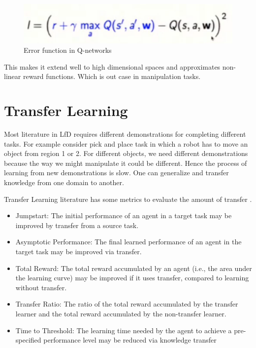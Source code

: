 \documentclass{article}[11pt]
\begin{document}
\begin{figure}[H]
  \begin{center}
    \includegraphics[width=0.5\linewidth]{images/error}
    \caption{Error function in Q-networks}
    \label{fig:error}
  \end{center}
\end{figure}

This makes it extend well to high dimensional spaces and approximates non-linear reward functions. Which is out case in manipulation tasks. 

\section{Transfer Learning}
Most literature in LfD requires different demonstrations for completing different tasks. For example consider pick and place task in which a robot has to move an object from region 1 or 2. For different objects, we need different demonstrations because the way we might manipulate it could be different. Hence the process of learning from new demonstrations is slow. One can generalize and transfer knowledge from one domain to another. 

Transfer Learning literature has some metrics to evaluate the amount of transfer \cite{taylor2009transfer}.

\begin{itemize}
\item Jumpstart: The initial performance of an agent in a target task may be improved by transfer
from a source task.
\item Asymptotic Performance: The final learned performance of an agent in the target task may be
improved via transfer.
\item Total Reward: The total reward accumulated by an agent (i.e., the area under the learning
curve) may be improved if it uses transfer, compared to learning without transfer.
\item Transfer Ratio: The ratio of the total reward accumulated by the transfer learner and the total
reward accumulated by the non-transfer learner.
\item Time to Threshold: The learning time needed by the agent to achieve a pre-specified performance
level may be reduced via knowledge transfer
\end{itemize}
\end{document}
